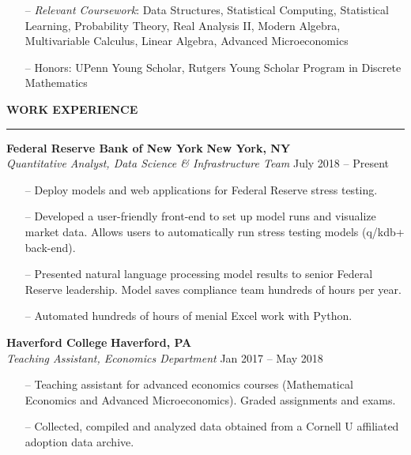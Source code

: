 \documentclass[paper=a4, fontsize=11pt]{scrartcl} %
\newcommand{\I}{--}
\newenvironment{mycenter}[1][\topsep]
  {\setlength{\topsep}{#1}\par\kern\topsep\centering}%
  {\par\kern\topsep}%
\begin{document}
\begin{itemize}[topsep=0pt,noitemsep]
	\item[\I] \textit{Relevant Coursework}: Data Structures, Statistical Computing, Statistical Learning, Probability Theory, Real Analysis II, Modern Algebra, Multivariable Calculus, Linear Algebra, Advanced Microeconomics
	\item[\I] Honors: UPenn Young Scholar, Rutgers Young Scholar Program in Discrete Mathematics
\end{itemize}

\vspace{2mm}

\begin{mycenter}[0pt]
\textsc{\textbf{WORK EXPERIENCE}}
\end{mycenter}

\vspace{-3mm}
\rule{\textwidth}{0.4pt}

\textbf{Federal Reserve Bank of New York} \hfill \textbf{New York, NY} \\
\textit{Quantitative Analyst, Data Science \& Infrastructure Team} \hfill July 2018 -- Present
\begin{itemize}[topsep=0pt,noitemsep]
	\item[\I] Deploy models and web applications for Federal Reserve stress testing.
	\item[\I] Developed a user-friendly front-end to set up model runs and visualize market data. Allows users to automatically run stress testing models (q/kdb+ back-end).
	\item[\I] Presented natural language processing model results to senior Federal Reserve leadership. Model saves compliance team hundreds of hours per year. 
	\item[\I] Automated hundreds of hours of menial Excel work with Python.
\end{itemize}

\textbf{Haverford College} \hfill \textbf{Haverford, PA}\\
\textit{Teaching Assistant, Economics Department}
\hfill Jan 2017 -- May 2018
\begin{itemize}[topsep=0pt,noitemsep]
  \item[\I] Teaching assistant for advanced economics courses (Mathematical Economics and Advanced Microeconomics). Graded assignments and exams. 
  \item[\I] Collected, compiled and analyzed data obtained from a Cornell U affiliated adoption data archive.
\end{itemize}
\end{document}
